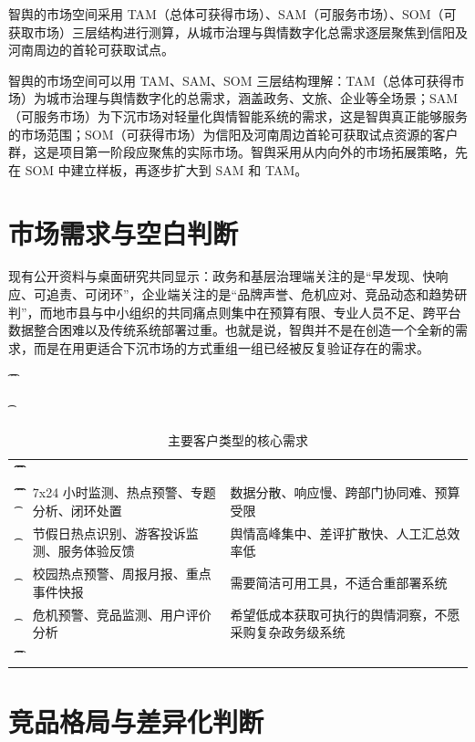 智舆的市场空间采用 TAM（总体可获得市场）、SAM（可服务市场）、SOM（可获取市场）三层结构进行测算，从城市治理与舆情数字化总需求逐层聚焦到信阳及河南周边的首轮可获取试点。

智舆的市场空间可以用 TAM、SAM、SOM 三层结构理解：TAM（总体可获得市场）为城市治理与舆情数字化的总需求，涵盖政务、文旅、企业等全场景；SAM（可服务市场）为下沉市场对轻量化舆情智能系统的需求，这是智舆真正能够服务的市场范围；SOM（可获得市场）为信阳及河南周边首轮可获取试点资源的客户群，这是项目第一阶段应聚焦的实际市场。智舆采用从内向外的市场拓展策略，先在 SOM 中建立样板，再逐步扩大到 SAM 和 TAM。

\section{市场需求与空白判断}

现有公开资料与桌面研究共同显示：政务和基层治理端关注的是“早发现、快响应、可追责、可闭环”，企业端关注的是“品牌声誉、危机应对、竞品动态和趋势研判”，而地市县与中小组织的共同痛点则集中在预算有限、专业人员不足、跨平台数据整合困难以及传统系统部署过重。也就是说，智舆并不是在创造一个全新的需求，而是在用更适合下沉市场的方式重组一组已经被反复验证存在的需求。

\begin{table}[htbp]
	\t\centering
	\t\caption{主要客户类型的核心需求}
	\t\begin{tabularx}{\textwidth}{|L{2.8cm}YL{3.4cm}|}
		\t\t\toprule
		\t\t{} &            &               \\
		\t\t\midrule
		\t\t{}
		\t{}        & 7x24 小时监测、热点预警、专题分析、闭环处置 & 数据分散、响应慢、跨部门协同难、预算受限        \\
		\t{}        & 节假日热点识别、游客投诉监测、服务体验反馈    & 舆情高峰集中、差评扩散快、人工汇总效率低        \\
		\t{}      & 校园热点预警、周报月报、重点事件快报       & 需要简洁可用工具，不适合重部署系统           \\
		\t{}       & 危机预警、竞品监测、用户评价分析         & 希望低成本获取可执行的舆情洞察，不愿采购复杂政务级系统 \\
		\t\t\bottomrule
		\t\end{tabularx}
\end{table}

\section{竞品格局与差异化判断}

